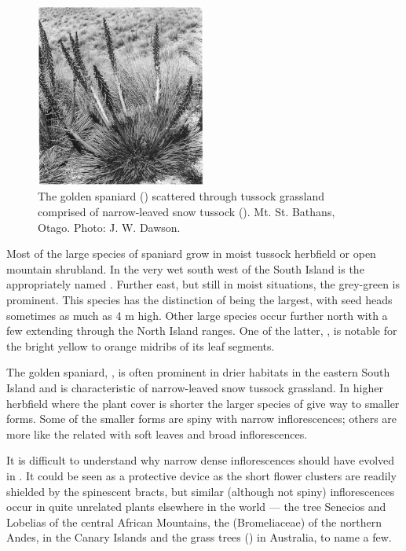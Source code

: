 \begin{figure}
	\includegraphics[width=0.5\textwidth]{graphics/figure98golden-spaniard.jpg}
	\centering
	\caption[The golden spaniard]{The golden spaniard () scattered through tussock grassland comprised of narrow-leaved snow tussock (). Mt. St. Bathans, Otago.
	Photo: J. W. Dawson.}
	\label{fig:98golden-spaniard}
\end{figure}

Most of the large species of spaniard grow in moist tussock herbfield or open mountain shrubland.
In the very wet south west of the South Island is the appropriately named .
Further east, but still in moist situations, the grey-green  is prominent.
This species has the distinction of being the largest, with seed heads sometimes as much as 4 m high.
Other large species occur further north with a few extending through the North Island ranges.
One of the latter, , is notable for the bright yellow to orange midribs of its leaf segments.

The golden spaniard, , is often prominent in drier habitats in the eastern South Island and is characteristic of narrow-leaved snow tussock grassland.
In higher herbfield where the plant cover is shorter the larger species of  give way to smaller forms.
Some of the smaller forms are spiny with narrow inflorescences; others are more like the related  with soft leaves and broad inflorescences.

It is difficult to understand why narrow dense inflorescences should have evolved in .
It could be seen as a protective device as the short flower clusters are readily shielded by the spinescent bracts, but similar (although not spiny) inflorescences occur in quite unrelated plants elsewhere in the world — the tree Senecios and Lobelias of the central African Mountains, the  (Bromeliaceae) of the northern Andes,  in the Canary Islands and the grass trees () in Australia, to name a few.

